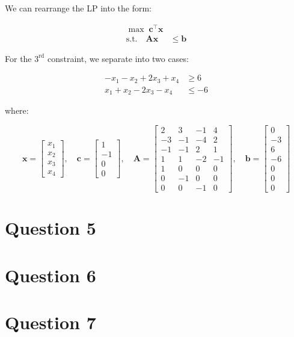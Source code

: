 \documentclass[12pt]{article}
\begin{document}
\noindent We can rearrange the LP into the form: 

\begin{align*}
    \max \; \mathbf{c}^{\top} \mathbf{x} & \\ 
    \text{s.t.} \quad \mathbf{A} \mathbf{x} & \leq \mathbf{b}
\end{align*}

\noindent For the $3^{\text{rd}}$ constraint, we separate into two cases: 

\begin{align*}
    - x_{1} - x_{2} + 2 x_{3} + x_{4} & \geq 6 \\
    x_{1} + x_{2} -2 x_{3} -x_{4} & \leq -6
\end{align*}

\noindent where:

\begin{equation*}
    \mathbf{x} = \begin{bmatrix}
        x_{1} \\ x_{2} \\ x_{3} \\ x_{4} 
    \end{bmatrix},
    \quad 
    \mathbf{c} = \begin{bmatrix}
        1 \\ -1 \\ 0 \\ 0
    \end{bmatrix},
    \quad 
    \mathbf{A} = \begin{bmatrix}
        2 & 3 & -1 & 4 \\ 
        -3 & -1 & -4 & 2 \\ 
        -1 & -1 & 2 & 1 \\ 
        1 & 1 & -2 & -1 \\ 
        1 & 0 & 0 & 0 \\ 
        0 & -1 & 0 & 0 \\ 
        0 & 0 & -1 & 0 
    \end{bmatrix},
    \quad 
    \mathbf{b} = \begin{bmatrix}
        0 \\ -3 \\ 6 \\ -6 \\ 0 \\ 0 \\ 0
    \end{bmatrix}
\end{equation*}


\section*{Question 5}

\section*{Question 6}

\section*{Question 7}
\end{document}
